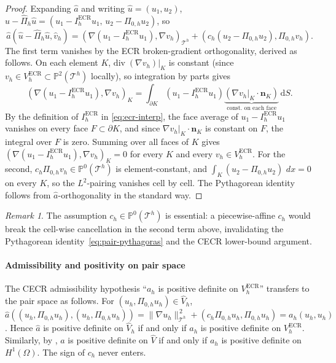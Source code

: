 \documentclass[11pt]{article}
\theoremstyle{plain}
\theoremstyle{definition}
\theoremstyle{remark}
\newtheorem{remark}{Remark}
\newcommand{\dx}{\,dx}
\newcommand{\ECR}{\mathrm{ECR}}
\begin{document}
\begin{proof}
Expanding $\widehat a$ and writing $\widehat u=(u_1,u_2)$,
$\widehat u-\widehat\Pi_h\widehat u
=(u_1-I_h^{\ECR}u_1,\,u_2-\Pi_{0,h}u_2)$, so
\[
  \widehat a(\widehat u-\widehat\Pi_h\widehat u,\widehat v_h)
  = (\nabla(u_1-I_h^{\ECR}u_1),\nabla v_h)_{\mathcal{T}^h}
  + (c_h(u_2-\Pi_{0,h}u_2),\Pi_{0,h}v_h).
\]
The first term vanishes by the ECR broken-gradient orthogonality,
derived as follows.
On each element $K$, $\text{div}\; (\nabla v_h)|_K$ is constant (since
$v_h\in V_h^{\ECR}\subset\mathbb{P}^2(\mathcal{T}^h)$ locally), so
integration by parts gives
\[
  (\nabla(u_1-I_h^{\ECR}u_1),\nabla v_h)_K
  = \int_{\partial K}(u_1-I_h^{\ECR}u_1)
    \underbrace{(\nabla v_h|_K\cdot\bm{n}_K)}_{\text{const.\ on each face}}\,\mathrm{d}S.
\]
By the definition of $I_h^{\ECR}$ in \eqref{eq:ecr-interp}, the
face average of $u_1-I_h^{\ECR}u_1$ vanishes on every face
$F\subset\partial K$, and since $\nabla v_h|_K\cdot\bm{n}_K$ is
constant on $F$, the integral over $F$ is zero.
Summing over all faces of $K$ gives
$(\nabla(u_1-I_h^{\ECR}u_1),\nabla v_h)_K=0$
for every $K$ and every $v_h\in V_h^{\ECR}$.
For the
second, $c_h\Pi_{0,h}v_h\in\mathbb{P}^0(\mathcal{T}^h)$ is
element-constant, and $\int_K(u_2-\Pi_{0,h}u_2)\,\dx=0$ on every $K$,
so the $L^2$-pairing vanishes cell by cell. The Pythagorean identity
follows from $\widehat a$-orthogonality in the standard way.
\end{proof}

\begin{remark}
The assumption $c_h\in\mathbb{P}^0(\mathcal{T}^h)$ is essential: a
piecewise-affine $c_h$ would break the cell-wise cancellation in the
second term above, invalidating the Pythagorean
identity~\eqref{eq:pair-pythagoras} and the CECR lower-bound argument.
\end{remark}

\paragraph{Admissibility and positivity on pair space}
The CECR admissibility hypothesis ``$a_h$ is positive definite on
$V_h^{\ECR}$'' transfers to the pair space as follows. For
$(u_h,\Pi_{0,h}u_h)\in\widehat V_h$,
$\widehat a((u_h,\Pi_{0,h}u_h),(u_h,\Pi_{0,h}u_h))
=\|\nabla u_h\|_{\mathcal{T}^h}^{\,2}+(c_h\Pi_{0,h}u_h,\Pi_{0,h}u_h)
=a_h(u_h,u_h)$.
Hence $\widehat a$ is positive definite on $\widehat V_h$ if and only
if $a_h$ is positive definite on $V_h^{\ECR}$. Similarly, by
, $\widehat a$ is positive definite on
$\widehat V$ if and only if $a_h$ is positive definite on
$H^1(\Omega)$. The sign of $c_h$ never enters.
\end{document}
